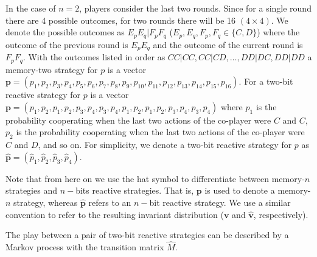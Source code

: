 \documentclass{article}
\theoremstyle{definition}
\begin{document}
In the case of \(n=2\), players consider the last two rounds. Since for a single
round there are 4 possible outcomes, for two rounds there will be 16 \((4 \times
4)\). We denote the possible outcomes as \(E_p E_q | F_p F_q\) (\(E_p, E_q, F_p,
F_q \in \{C, D\}\)) where the outcome of the previous round is \(E_p E_q\) and
the outcome of the current round is \(F_p F_q\). With the outcomes listed in
order as \(CC|CC, CC|CD, \dots, DD|DC, DD|DD\) a memory-two strategy for \(p\) is a
vector \(\mathbf{p} = (p_1, p_2, p_3, p_4, p_5, p_6, p_7, p_8, p_9, p_{10},
p_{11}, p_{12}, p_{13}, p_{14}, \allowbreak p_{15}, p_{16})\). For a two-bit
reactive strategy for \(p\) is a vector \(\mathbf{p} = (p_1, p_2, p_1, p_2, p_3,
p_4, p_3, p_4, p_1, p_2, p_1, p_2, p_3, p_4, \allowbreak p_3, p_4)\) where
\(p_1\) is the probability cooperating when the last two actions of the
co-player were \(C\) and \(C\), \(p_2\) is the probability cooperating when the
last two actions of the co-player were \(C\) and \(D\), and so on. For
simplicity, we denote a two-bit reactive strategy for \(p\) as
\(\mathbf{\hat{p}} = (\hat{p}_1, \hat{p}_2, \hat{p}_3, \hat{p}_4)\).

Note that from here on we use the hat symbol to differentiate between
memory-\(n\) strategies and  \(n-\)bits reactive strategies. That is, \(\mathbf{p}\)
is used to denote a memory-\(n\) strategy, whereas \(\mathbf{\hat{p}}\) refers to an \(n-\)bit
reactive strategy. We use a similar convention to refer to the resulting invariant distribution (\(\mathbf{v}\) and \(\mathbf{\hat{v}}\), respectively). 

The play between a pair of two-bit reactive strategies can be described by a Markov
process with the transition matrix \(\hat{M}\).
\end{document}
